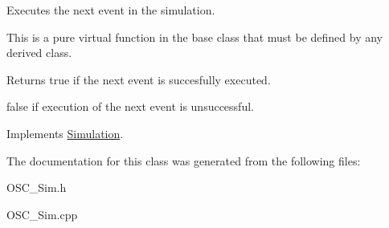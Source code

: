 Executes the next event in the simulation. 

This is a pure virtual function in the base class that must be defined by any derived class. \begin{DoxyReturn}{Returns}
true if the next event is succesfully executed. 

false if execution of the next event is unsuccessful. 
\end{DoxyReturn}


Implements \hyperlink{class_simulation_a48e9e82f9dac1acec5d063a9f6f6115e}{Simulation}.



The documentation for this class was generated from the following files\+:\begin{DoxyCompactItemize}
\item 
O\+S\+C\+\_\+\+Sim.\+h\item 
O\+S\+C\+\_\+\+Sim.\+cpp\end{DoxyCompactItemize}
